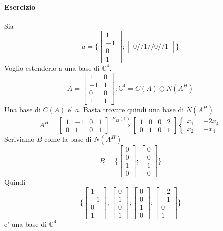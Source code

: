 \documentclass[a4paper, 10pt]{article}
\begin{document}
	\paragraph*{Esercizio} Sia \[a = \lbrace \begin{bmatrix}1 \\ -1 \\0 \\ 1 \end{bmatrix}; 
	\begin{bmatrix}0 // 1 // 0 // 1 \end{bmatrix} \rbrace \] Voglio estenderlo a una base di $\mathbb{C}^4$.
	\[
	A= \begin{bmatrix}1 & 0 \\ -1 & 1 \\ 0 & 0 \\ 1 & 1 \end{bmatrix} : \mathbb{C}^4 = C(A) \oplus N(A^H) \]
	Una base di $C(A)$ e' $a$. Basta trovare quindi una base di $N(A^H)$
	\[ 
		A^H = \begin{bmatrix} 1 & -1 & 0 & 1 \\ 0 & 1 & 0 & 1 \end{bmatrix} \stackrel{E_{12}(1)}{\Longrightarrow}
		\begin{bmatrix}1 & 0 & 0 & 2 \\ 0 & 1 & 0 & 1 \end{bmatrix}\begin{cases} x_1 = -2x_4 \\ x_2 = -x_4 \end{cases}
	\]
	Scriviamo $B$ come la base di $N(A^H)$
	\[ B = \lbrace \begin{bmatrix} 0 \\ 0 \\ 1 \\ 0 \end{bmatrix} ; \begin{bmatrix} 0 \\ 0 \\ 1 \\ 0 \end{bmatrix} \rbrace \]
	Quindi 
	\[ \lbrace \begin{bmatrix} 1 \\ -1 \\ 0 \\1 \end{bmatrix} ; \begin{bmatrix} 0 \\ 1 \\ 0 \\ 1 \end{bmatrix} ; 
			  \begin{bmatrix} 0 \\ 0 \\ 1 \\ 0 \end{bmatrix} ; \begin{bmatrix} -2 \\ -1 \\ 0 \\ 1 \end{bmatrix} \rbrace \]
			  e' una base di $\mathbb{C}^4$			   
\end{document}
